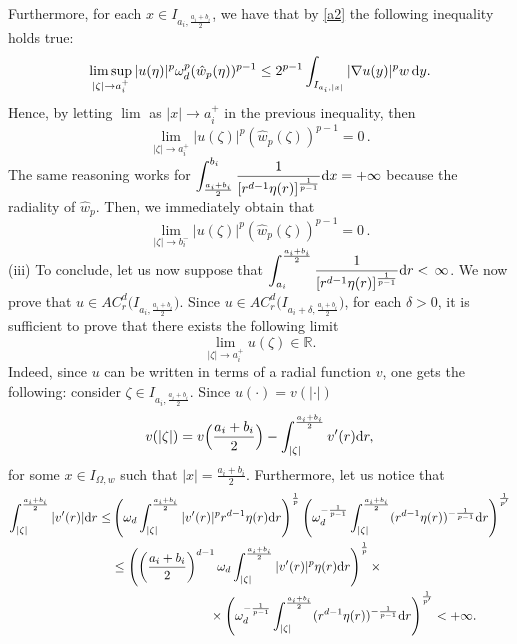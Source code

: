 \documentclass[11pt,leqno]{amsart}
\theoremstyle{remark}
\theoremstyle{definition}
\theoremstyle{definition}
\newcommand{\wstar}{{\hat w}}
\newcommand{\bbR}{{\mathbb{R}}}
\newcommand{\R}{\bbR}
\def\de{{\rm d}}
\begin{document}
Furthermore,  for each $x\in I_{a_i,\frac{a_i+b_i}{2}}$, we have that by \eqref{a2} the following inequality holds true:
$$
\limsup_{\vert\zeta\vert\to a_i^+}|u(\eta)|^{p}\omega_{d}^{p}(\wstar_{p}(\eta))^{p-1}\leq 2^{p-1}\int_{I_{a_{i},\vert x\vert}}|\nabla u(y)|^{p}w\,\de y.
$$
Hence, by letting $\lim$ as $\vert x\vert\to a_i^+$ in the previous inequality, then
\[
\lim_{\vert \zeta\vert\to a_i^+}|u(\zeta)|^{p}(\wstar_{p}(\zeta))^{p-1}= 0\,.
\]
The same reasoning works for $\displaystyle{\int_{\frac{a_i+b_i}{2}}^{b_i}\frac{1}{[r^{d-1}\eta(r)]^{\frac{1}{p-1}}}\de x=+\infty}$ because the radiality of $\hat{w}_{p}$. Then, we immediately obtain that
\[
\lim_{\vert \zeta\vert\to b_i^-}|u(\zeta)|^{p}(\wstar_{p}(\zeta))^{p-1}= 0\,.
\]
(iii) To conclude, let us now suppose that $\displaystyle{\int_{a_i}^{\frac{a_i+b_i}{2}}\frac{1}{[r^{d-1}\eta(r)]^{\frac{1}{p-1}}}\de r<\,\infty}$. We now prove that $u\in AC_{r}^{d}\big(I_{a_i,\frac{a_i+b_i}{2}}\big)$. Since $u\in AC_{r}^{d}\big(I_{a_i+\delta,\frac{a_i+b_i}{2}}\big)$, for each $\delta>0$, it is sufficient to prove that there exists the following limit
\begin{equation}\label{popol}
\lim_{\vert \zeta\vert\to a_i^+}u(\zeta)\in\R.
\end{equation}
Indeed, since $u$ can be written in terms of a radial function $v$, one gets the following: consider $\zeta\in I_{a_i,\frac{a_i+b_i}{2}}$. Since $u(\cdot)=v(\vert \cdot\vert)$
\begin{equation}\label{mbmb}
v(\vert \zeta\vert)=v\Big(\frac{a_i+b_i}{2}\Big)-\int_{\vert\zeta\vert}^{\frac{a_i+b_i}{2}}v'(r) \de r,
\end{equation}
for some $x\in I_{\Omega,w}$ such that $\vert x\vert=\frac{a_i+b_i}{2}$. Furthermore, let us notice that
\begin{align}
\int_{\vert \zeta\vert}^{\frac{a_i+b_i}{2}}\vert v'(r)\vert \de r\leq &\left(\omega_{d}\int_{\vert \zeta\vert}^{\frac{a_i+b_i}{2}}\vert v'(r)\vert^{p}r^{d-1}\eta(r)\de r\right)^{\frac{1}{p}}\left(\omega_{d}^{-\frac{1}{p-1}}\int_{\vert \zeta\vert}^{\frac{a_i+b_i}{2}}(r^{d-1}\eta(r))^{-\frac{1}{p-1}}\de r\right)^{\frac{1}{p'}}\nonumber\\
\label{rtrt}
&\leq \left(\left(\frac{a_{i}+b_{i}}{2}\right)^{d-1}\omega_{d}\int_{\vert \zeta\vert}^{\frac{a_i+b_i}{2}}\vert v'(r)\vert^{p}\eta(r)\de r\right)^{\frac{1}{p}}\times\\
&\phantom{formulaformula}\times\left(\omega_{d}^{-\frac{1}{p-1}}\int_{\vert \zeta\vert}^{\frac{a_i+b_i}{2}}(r^{d-1}\eta(r))^{-\frac{1}{p-1}}\de r\right)^{\frac{1}{p'}}
<+\infty\nonumber.
\end{align}
\end{document}
